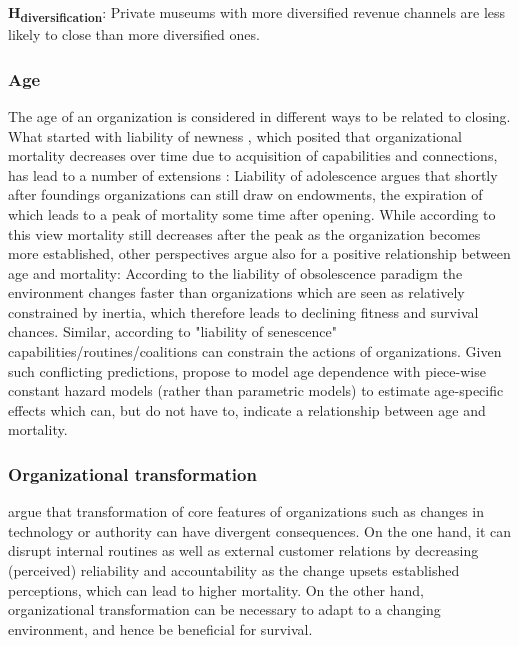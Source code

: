 \documentclass[11pt]{article}
\begin{document}
\bigbreak
\noindent
\textbf{H\textsubscript{diversification}}: Private museums with more diversified revenue channels are less likely to close than more diversified ones.

\subsubsection*{Age}



The age of an organization is considered in different ways to be related to closing.
What started with liability of newness \parencite{Stinchcombe_1965_structure}, which posited that organizational mortality decreases over time due to acquisition of capabilities and connections, has lead to a number of extensions \parencite{Carroll_Khessina_2019_demography,Hannan_1998_mortality}:
Liability of adolescence argues that shortly after foundings organizations can still draw on endowments, the expiration of which leads to a peak of mortality some time after opening.
While according to this view mortality still decreases after the peak as the organization becomes more established, other perspectives argue also for a positive relationship between age and mortality:
According to the liability of obsolescence paradigm the environment changes faster than organizations which are seen as relatively constrained by inertia, which therefore leads to declining fitness and survival chances.
Similar, according to "liability of senescence" capabilities/routines/coalitions can constrain the actions of organizations.
Given such conflicting predictions, \textcite{Carroll_Khessina_2019_demography} propose to model age dependence with piece-wise constant hazard models (rather than parametric models) to estimate age-specific effects which can, but do not have to, indicate a relationship between age and mortality.



\subsubsection*{Organizational transformation}

\textcite{Carroll_Khessina_2019_demography} argue that transformation of core features of organizations such as changes in technology or authority can have divergent consequences. 
On the one hand, it can disrupt internal routines as well as external customer relations by decreasing (perceived) reliability and accountability as the change upsets established perceptions, which can lead to higher mortality. 
On the other hand, organizational transformation can be necessary to adapt to a changing environment, and hence be beneficial for survival.
\end{document}
